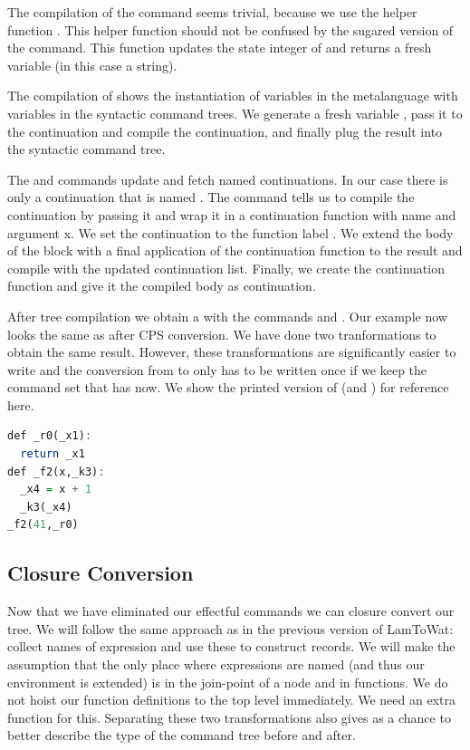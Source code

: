 The compilation of the  command seems trivial, because we use the helper function . This helper function should not be confused by the sugared version of the  command. This function updates the state integer of  and returns a fresh variable (in this case a string).

The compilation of  shows the instantiation of variables in the metalanguage with variables in the syntactic command trees. We generate a fresh variable , pass it to the continuation and compile the continuation, and finally plug the result into the syntactic command tree.

The  and  commands update and fetch named continuations. In our case there is only a continuation that is named . The  command tells us to compile the continuation  by passing it  and wrap it in a continuation function with name  and argument {x}. We set the continuation  to the function label . We extend the body of the block with a final application of the continuation function  to the result  and compile with the updated continuation list. Finally, we create the continuation function and give it the compiled body  as continuation.

After tree compilation we obtain a  with the commands  and . Our example  now looks the same as  after CPS conversion. We have done two tranformations to obtain the same result. However, these transformations are significantly easier to write and the conversion from  to  only has to be written once if we keep the command set that  has now. We show the printed version of  (and ) for reference here.

\begin{lstlisting}[language=Haskell]
def _r0(_x1):
  return _x1
def _f2(x,_k3):
  _x4 = x + 1
  _k3(_x4)
_f2(41,_r0)
\end{lstlisting}

\subsection{\label{subsection:closconvert2}Closure Conversion}
Now that we have eliminated our effectful commands we can closure convert our tree. We will follow the same approach as in the previous version of LamToWat: collect names of expression and use these to construct records. We will make the assumption that the only place where expressions are named (and thus our environment is extended) is in the join-point of a node and in functions. We do not hoist our function definitions to the top level immediately. We need an extra function for this. Separating these two transformations also gives as a chance to better describe the type of the command tree before and after.

